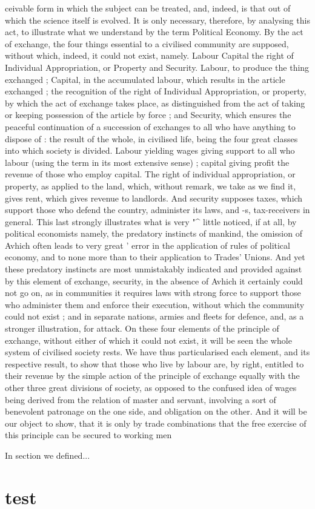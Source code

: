 \documentclass[12pt, a4paper]{article}
\begin{document}
    ceivable form in which the subject can be treated, and, indeed, is that
out of which the science itself is evolved. It is only necessary, therefore, by analysing this act, to illustrate what we understand by the
term Political Economy. By the act of exchange, the four things
essential to a civilised community are supposed, without which, indeed,
it could not exist, namely. Labour Capital the right of Individual
Appropriation, or Property and Security. Labour, to produce the
thing exchanged ; Capital, in the accumulated labour, which results
in the article exchanged ; the recognition of the right of Individual
Appropriation, or property, by which the act of exchange takes place,
as distinguished from the act of taking or keeping possession of the
article by force ; and Security, which ensures the peaceful continuation
of a succession of exchanges to all who have anything to dispose of :
the result of the whole, in civilised life, being the four great
classes into which society is divided. Labour yielding wages
giving support to all who labour (using the term in its most
extensive sense) ; capital giving profit the revenue of those who
employ capital. The right of individual appropriation, or property, as
applied to the land, which, without remark, we take as we find
it,
gives
rent, which gives revenue to landlords. And security supposes taxes,
which support those who defend the country, administer its laws, and
-s, tax-receivers in general. This last strongly illustrates what
is
very
"^
little noticed,
if
at all, by political economists namely, the predatory
instincts of mankind, the omission of Avhich often leads to very great
'
error in the application of rules of political economy, and to none
more than to their application to Trades' Unions. And yet these
predatory instincts are most unmistakably indicated and provided
against by this element of exchange, security, in the absence of Avhich
it
certainly could not go on, as in communities
it
requires laws with
strong force to support those who administer them and enforce
their execution, without which the community could not exist ; and
in separate nations, armies and fleets for defence, and, as a
stronger illustration, for attack. On these four elements of the
principle of exchange, without either of which
it
could not exist,
it
will be seen the whole system of civilised society rests. We have thus
particularised each element, and its respective result, to show that
those who live by labour are, by right, entitled to their revenue by the
simple action of the principle of exchange equally with the other three
great divisions of society, as opposed to the confused idea of wages
being derived from the relation of master and servant, involving a sort
of benevolent patronage on the one side, and obligation on the other.
And
it
will be our object to show, that
it
is
only by trade combinations
that the free exercise of this principle can be secured to working men

    In section  we defined...
    
    \section{test} \label{marker}
    
\end{document}
